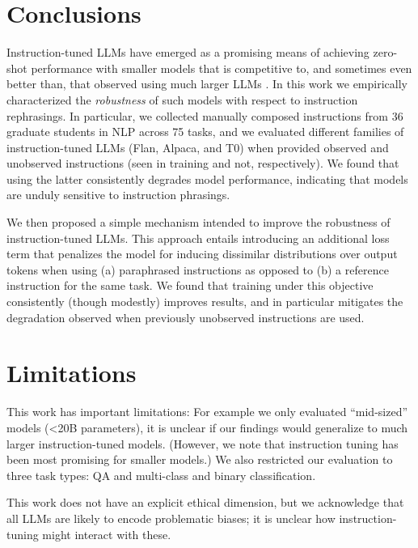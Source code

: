 \section{Conclusions}
\label{section:conclusions}
\vspace{-.35em}

Instruction-tuned LLMs have emerged as a promising means of achieving zero-shot performance with smaller models that is competitive to, and sometimes even better than, that observed using much larger LLMs \cite{longpre2023flan,alpaca}. 
In this work we empirically characterized the \emph{robustness} of such models with respect to instruction rephrasings. 
In particular, we collected manually composed instructions from 36 graduate students in NLP across 75 tasks, and we evaluated different families of instruction-tuned LLMs (Flan, Alpaca, and T0) when provided observed and unobserved instructions (seen in training and not, respectively). %
We found that using the latter consistently degrades model performance, indicating that models are unduly sensitive to instruction phrasings.

We then proposed a simple mechanism intended to improve the robustness of instruction-tuned LLMs.
This approach entails introducing an additional loss term that penalizes the model for inducing dissimilar distributions over output tokens when using (a) paraphrased instructions as opposed to (b) a reference instruction for the same task.
We found that training under this objective consistently (though modestly) improves results, and in particular mitigates the degradation observed when previously unobserved instructions are used. 

\section{Limitations}
\label{section:limitations}
\vspace{-.35em}

This work has important limitations: For example we only evaluated ``mid-sized'' models (<20B parameters), it is unclear if our findings would generalize to much larger instruction-tuned models. (However, we note that instruction tuning has been most promising for smaller models.) 
We also restricted our evaluation to three task types: QA and multi-class and binary classification.

\vspace{0.1em}
 This work does not have an explicit ethical dimension, but we acknowledge that all LLMs are likely to encode problematic biases; it is unclear how instruction-tuning might interact with these. 

